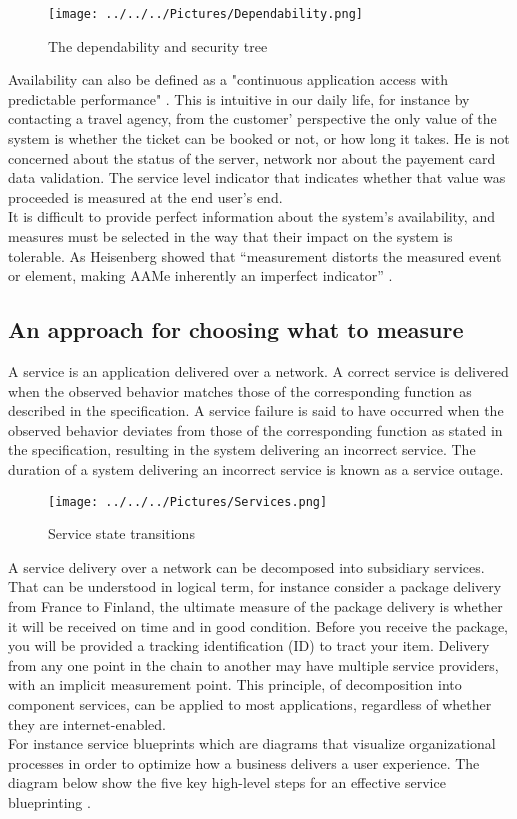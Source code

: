 \documentclass[english]{tktltiki2}
\theoremstyle{definition}
\theoremstyle{remark}
\begin{document}
\begin{figure}[h!]
\texttt{[image: ../../../Pictures/Dependability.png]} 
\caption{The dependability and security tree \cite{Avizienis2004BasicCA}}
\label{fig:DS} 
\end{figure}

Availability can also be defined as a "continuous application access with predictable performance" \cite{AAMES}. This is intuitive in our daily life, for instance by contacting a travel agency, from the customer' perspective the only value of the system is whether the ticket can be booked or not, or how long it takes. He is not concerned about the status of the server, network nor about the payement card data validation.
The service level indicator that indicates whether that value was proceeded is measured at the end user's end.\\
It is difficult to provide perfect information about the
system's availability, and measures must be selected in the way that their impact on the system is tolerable.
As Heisenberg showed that “measurement distorts the measured event or element, making AAMe inherently an imperfect indicator” \cite{AAMES}.

\subsection{An approach for choosing what to measure} \label{APPROACH}
A service is an application delivered over a network. A correct service is delivered when the observed behavior matches those of the corresponding function as described in the specification. A service failure is said to have occurred when the observed behavior deviates from those of the corresponding function as stated in the specification, resulting in the system delivering an incorrect service. The duration of a system delivering an incorrect service is known as a service outage.

\begin{figure}[h!]
\texttt{[image: ../../../Pictures/Services.png]} 
\caption{Service state transitions \cite{article1}}
\label{fig:SS} 
\end{figure}

A service delivery over a network can be decomposed into subsidiary services.  That can be understood in logical term, for instance consider a package delivery from France to Finland, the ultimate measure of the package delivery is whether it will be received on time and in good condition. Before you receive  the package, you will be provided a tracking identification (ID) to tract your item. Delivery from any one point in the chain to another may have multiple service providers, with an implicit measurement point.
This principle, of decomposition into component services, can be applied to most applications, regardless of whether they are internet-enabled.\\
For instance service blueprints which are diagrams that visualize organizational processes in order to optimize how a business delivers a user experience. The diagram below show the five key high-level steps for an effective service blueprinting \cite{Blueprint}.
\end{document}
